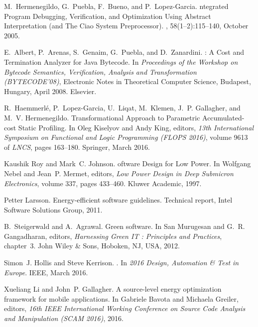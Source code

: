\documentclass[oneside]{book}
\begin{document}
\begin{thebibliography}{10}
M.~Hermenegildo, G.~Puebla, F.~Bueno, and P.~Lopez-Garcia.
ntegrated {P}rogram {D}ebugging, {V}erification, and
  {O}ptimization {U}sing {A}bstract {I}nterpretation (and {T}he {C}iao {S}ystem
  {P}reprocessor).
, 58(1--2):115--140, October
  2005.

E.~Albert, P.~Arenas, S.~Genaim, G.~Puebla, and D.~Zanardini.
: {A} {C}ost and {T}ermination {A}nalyzer for {J}ava
  {B}ytecode.
\newblock In {\em Proceedings of the Workshop on Bytecode Semantics,
  Verification, Analysis and Transformation (BYTECODE'08)}, Electronic Notes in
  Theoretical Computer Science, Budapest, Hungary, April 2008. Elsevier.

R.~Haemmerl{\'e}, P.~Lopez-Garcia, U.~Liqat, M.~Klemen, J.~P. Gallagher, and
  M.~V. Hermenegildo.
 {T}ransformational {A}pproach to {P}arametric {A}ccumulated-cost
  {S}tatic {P}rofiling.
\newblock In Oleg Kiselyov and Andy King, editors, {\em 13th International
  Symposium on Functional and Logic Programming (FLOPS 2016)}, volume 9613 of
  {\em LNCS}, pages 163--180. Springer, March 2016.

Kaushik Roy and Mark~C. Johnson.
oftware {D}esign for {L}ow {P}ower.
\newblock In Wolfgang Nebel and Jean~P. Mermet, editors, {\em Low Power Design
  in Deep Submicron Electronics}, volume 337, pages 433--460. Kluwer Academic,
  1997.

Petter Larsson.
\newblock Energy-efficient software guidelines.
\newblock Technical report, Intel Software Solutions Group, 2011.

B.~Steigerwald and A.~Agrawal.
\newblock Green software.
\newblock In San Murugesan and G.~R. Gangadharan, editors, {\em Harnessing
  Green IT : Principles and Practices}, chapter~3. John Wiley \& Sons, Hoboken,
  NJ, USA, 2012.

Simon~J. Hollis and Steve Kerrison.
.
\newblock In {\em 2016 Design, Automation \& Test in Europe}. IEEE, March 2016.

Xueliang Li and John~P. Gallagher.
\newblock A source-level energy optimization framework for mobile applications.
\newblock In Gabriele Bavota and Michaela Greiler, editors, {\em 16th IEEE
  International Working Conference on Source Code Analysis and Manipulation
  (SCAM 2016)}, 2016.

\end{thebibliography}
\end{document}
